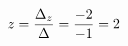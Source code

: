 \documentclass[preview]{standalone}
\begin{document}
\begin{align*}
\special{dvisvgm:raw <g id='unique000'>}z = \frac{\Delta_z}{\Delta} = \frac{-2}{-1} = 2\special{dvisvgm:raw </g>}
\end{align*}
\end{document}
